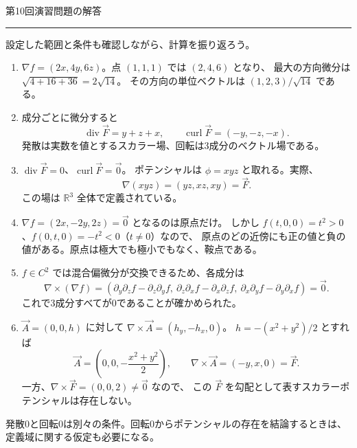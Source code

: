 \documentclass[a4paper,10pt,pdflatex,ja=standard,jafont=ipaex-type1,
  magstyle=real,scale=1]{bxjsarticle}
\newcommand{\handouttitle}[1]{%
  \begin{center}
    {\Large\color{ink}#1}\par\vspace{3mm}
    {\color{accent}\rule{0.88\linewidth}{0.7pt}}
  \end{center}\vspace{-2mm}}
\newcommand{\keybox}[1]{\par\vspace{3pt}\begingroup
  \setlength{\fboxsep}{4pt}%
  \colorbox{soft}{\parbox{\dimexpr\linewidth-2\fboxsep\relax}{\small #1}}%
  \endgroup\par\vspace{2pt}}
\newenvironment{problems}
  {\begin{enumerate}[leftmargin=2em,itemsep=3pt,topsep=3pt,parsep=0pt,
    font=\color{accent}]}
  {\end{enumerate}}
\begin{document}
\newpage
\handouttitle{第10回\quad 演習問題の解答}
{\small 設定した範囲と条件も確認しながら、計算を振り返ろう。}\par
\begin{problems}
\setlength{\itemsep}{7pt}
\item $\nabla f=(2x,4y,6z)$。点 $(1,1,1)$ では $(2,4,6)$ となり、
最大の方向微分は $\sqrt{4+16+36}=2\sqrt{14}$。
その方向の単位ベクトルは $(1,2,3)/\sqrt{14}$ である。

\item 成分ごとに微分すると
$$
 \operatorname{div}\vec F=y+z+x,\qquad
 \operatorname{curl}\vec F=(-y,-z,-x).
$$
発散は実数を値とするスカラー場、回転は3成分のベクトル場である。

\item $\operatorname{div}\vec F=0$、$\operatorname{curl}\vec F=\vec0$。
ポテンシャルは $\phi=xyz$ と取れる。実際、
$$
 \nabla(xyz)=(yz,xz,xy)=\vec F.
$$
この場は $\mathbb R^3$ 全体で定義されている。

\item $\nabla f=(2x,-2y,2z)=\vec0$ となるのは原点だけ。
しかし $f(t,0,0)=t^2>0$、$f(0,t,0)=-t^2<0$（$t\ne0$）なので、
原点のどの近傍にも正の値と負の値がある。原点は極大でも極小でもなく、鞍点である。

\item $f\in C^2$ では混合偏微分が交換できるため、各成分は
$$
 \nabla\times(\nabla f)
 =(\partial_y\partial_zf-\partial_z\partial_yf,\
   \partial_z\partial_xf-\partial_x\partial_zf,\
   \partial_x\partial_yf-\partial_y\partial_xf)=\vec0.
$$
これで3成分すべてが0であることが確かめられた。

\item $\vec A=(0,0,h)$ に対して $\nabla\times\vec A=(h_y,-h_x,0)$。
$h=-(x^2+y^2)/2$ とすれば
$$
 \vec A=\left(0,0,-\frac{x^2+y^2}{2}\right),\qquad
 \nabla\times\vec A=(-y,x,0)=\vec F.
$$
一方、$\nabla\times\vec F=(0,0,2)\ne\vec0$ なので、
この $\vec F$ を勾配として表すスカラーポテンシャルは存在しない。
\end{problems}
\keybox{発散0と回転0は別々の条件。回転0からポテンシャルの存在を結論するときは、定義域に関する仮定も必要になる。}
\end{document}
